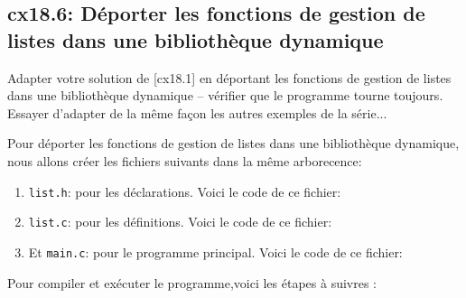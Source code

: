 \documentclass[a4paper,11pt]{article}
\begin{document}
        \subsection{cx18.6: Déporter les fonctions de gestion de listes dans une bibliothèque dynamique}

        \noindent Adapter votre solution de [cx18.1] en déportant les fonctions de gestion de listes dans une
        bibliothèque dynamique – vérifier que le programme tourne toujours. \\
        Essayer d'adapter de la même façon les autres exemples de la série...

        \bigskip
        \noindent Pour déporter les fonctions de gestion de listes dans une bibliothèque dynamique, 
        nous allons créer les fichiers suivants dans la même arborecence: 
        \begin{enumerate}
          \item \texttt{list.h}: pour les déclarations. Voici le code de ce fichier: 
            
          \newpage
          \item \texttt{list.c}: pour les définitions. Voici le code de ce fichier:
            
          \item Et \texttt{main.c}: pour le programme principal. Voici le code de ce fichier:
            
        \end{enumerate}
        \noindent Pour compiler et exécuter le programme,voici les étapes à suivres :
\end{document}
